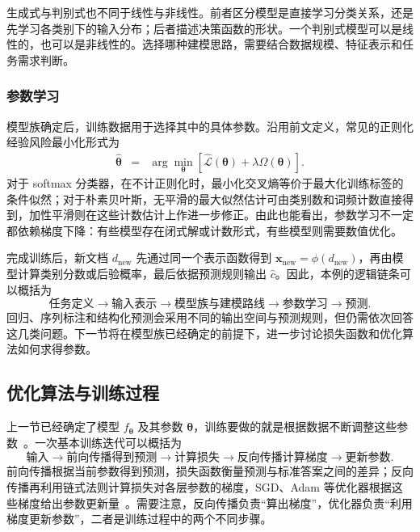 生成式与判别式也不同于线性与非线性。前者区分模型是直接学习分类关系，还是先学习各类别下的输入分布；后者描述决策函数的形状。一个判别式模型可以是线性的，也可以是非线性的。选择哪种建模思路，需要结合数据规模、特征表示和任务需求判断。

\subsubsection{参数学习}

模型族确定后，训练数据用于选择其中的具体参数。沿用前文定义，常见的正则化经验风险最小化形式为
\begin{eqnarray}
\hat{\boldsymbol{\theta}}
& = &
\arg\min_{\boldsymbol{\theta}}
\left[
\hat{\mathcal{L}}(\boldsymbol{\theta})
+\lambda\Omega(\boldsymbol{\theta})
\right].
\end{eqnarray}
对于 softmax 分类器，在不计正则化时，最小化交叉熵等价于最大化训练标签的条件似然；对于朴素贝叶斯，无平滑的最大似然估计可由类别数和词频计数直接得到，加性平滑则在这些计数估计上作进一步修正。由此也能看出，参数学习不一定都依赖梯度下降：有些模型存在闭式解或计数形式，有些模型则需要数值优化。

完成训练后，新文档 $d_{\mathrm{new}}$ 先通过同一个表示函数得到 $\mathbf{x}_{\mathrm{new}}=\phi(d_{\mathrm{new}})$，再由模型计算类别分数或后验概率，最后依据预测规则输出 $\hat{c}$。因此，本例的逻辑链条可以概括为
\[
\text{任务定义}
\longrightarrow
\text{输入表示}
\longrightarrow
\text{模型族与建模路线}
\longrightarrow
\text{参数学习}
\longrightarrow
\text{预测}.
\]
回归、序列标注和结构化预测会采用不同的输出空间与预测规则，但仍需依次回答这几类问题。下一节将在模型族已经确定的前提下，进一步讨论损失函数和优化算法如何求得参数。

\subsection{优化算法与训练过程}

上一节已经确定了模型 $f_{\boldsymbol{\theta}}$ 及其参数 $\boldsymbol{\theta}$，训练要做的就是根据数据不断调整这些参数~\cite{Mitchell:1997}。一次基本训练迭代可以概括为
\[
\text{输入}
\longrightarrow
\text{前向传播得到预测}
\longrightarrow
\text{计算损失}
\longrightarrow
\text{反向传播计算梯度}
\longrightarrow
\text{更新参数}.
\]
前向传播根据当前参数得到预测，损失函数衡量预测与标准答案之间的差异；反向传播再利用链式法则计算损失对各层参数的梯度，SGD、Adam 等优化器根据这些梯度给出参数更新量~\cite{RumelhartEtAl1986Backprop,KingmaBa2015Adam}。需要注意，反向传播负责“算出梯度”，优化器负责“利用梯度更新参数”，二者是训练过程中的两个不同步骤。

